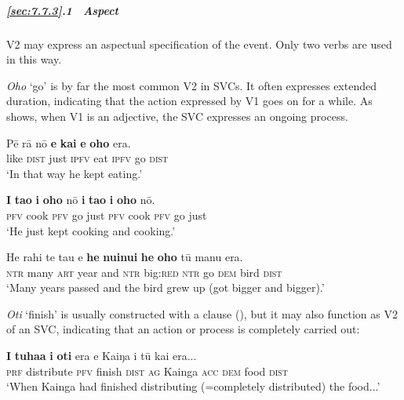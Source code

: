 \subparagraph{\ref{sec:7.7.3}.1~ Aspect} V2 may express an aspectual specification of the event. Only two verbs are used in this way.

\textit{Oho} ‘go’ is by far the most common V2 in SVCs. It often expresses extended duration, indicating that the action expressed by V1 goes on for a while. As  shows, when V1 is an adjective, the SVC expresses an ongoing process.

\ea\label{ex:7.178}
\gll Pē rā nō \textbf{e} \textbf{kai} \textbf{e} \textbf{oho} era. \\
like \textsc{dist} just \textsc{ipfv} eat \textsc{ipfv} go \textsc{dist} \\

\glt 
‘In that way he kept eating.’ \textstyleExampleref{[R310.225]} 
\z

\ea\label{ex:7.179}
\gll \textbf{I} \textbf{ta{\ꞌ}o} \textbf{i} \textbf{oho} nō \textbf{i} \textbf{ta{\ꞌ}o} \textbf{i} \textbf{oho} nō. \\
\textsc{pfv} cook \textsc{pfv} go just \textsc{pfv} cook \textsc{pfv} go just \\

\glt 
‘He just kept cooking and cooking.’ \textstyleExampleref{[R352.077]} 
\z

\ea\label{ex:7.180}
\gll He rahi te ta{\ꞌ}u {\ꞌ}e \textbf{he} \textbf{nuinui} \textbf{he} \textbf{oho} tū manu era. \\
\textsc{ntr} many \textsc{art} year and \textsc{ntr} big:\textsc{red} \textsc{ntr} go \textsc{dem} bird \textsc{dist} \\

\glt
‘Many years passed and the bird grew up (got bigger and bigger).’ \textstyleExampleref{[R447.012]} 
\z

\textit{Oti} ‘finish’ is usually constructed with a  clause (), but it may also function as V2 of an SVC, indicating that an action or process is completely carried out:

\ea\label{ex:7.181}
\gll \textbf{I} \textbf{tuha{\ꞌ}a} \textbf{i} \textbf{oti} era e Kaiŋa i tū kai era... \\
\textsc{prf} distribute \textsc{pfv} finish \textsc{dist} \textsc{ag} Kainga \textsc{acc} \textsc{dem} food \textsc{dist} \\

\glt 
‘When Kainga had finished distributing (=completely distributed) the food...’ \textstyleExampleref{[R304.116]} 
\z


